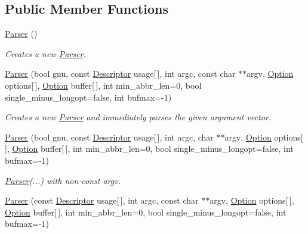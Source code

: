 \subsection*{\-Public \-Member \-Functions}
\begin{DoxyCompactItemize}
\item 
\hypertarget{classoption_1_1_parser_a895e9a1db19f1a026ee6a7412de17d04}{\hyperlink{classoption_1_1_parser_a895e9a1db19f1a026ee6a7412de17d04}{\-Parser} ()}\label{classoption_1_1_parser_a895e9a1db19f1a026ee6a7412de17d04}

\begin{DoxyCompactList}\small\item\em \-Creates a new \hyperlink{classoption_1_1_parser}{\-Parser}. \end{DoxyCompactList}\item 
\hyperlink{classoption_1_1_parser_aa747e9792c9c08ede32b6c323438db71}{\-Parser} (bool gnu, const \hyperlink{structoption_1_1_descriptor}{\-Descriptor} usage\mbox{[}$\,$\mbox{]}, int argc, const char $\ast$$\ast$argv, \hyperlink{classoption_1_1_option}{\-Option} options\mbox{[}$\,$\mbox{]}, \hyperlink{classoption_1_1_option}{\-Option} buffer\mbox{[}$\,$\mbox{]}, int min\-\_\-abbr\-\_\-len=0, bool single\-\_\-minus\-\_\-longopt=false, int bufmax=-\/1)
\begin{DoxyCompactList}\small\item\em \-Creates a new \hyperlink{classoption_1_1_parser}{\-Parser} and immediately parses the given argument vector. \end{DoxyCompactList}\item 
\hypertarget{classoption_1_1_parser_a78b4c7d73fff17204dd908b1b167dec9}{\hyperlink{classoption_1_1_parser_a78b4c7d73fff17204dd908b1b167dec9}{\-Parser} (bool gnu, const \hyperlink{structoption_1_1_descriptor}{\-Descriptor} usage\mbox{[}$\,$\mbox{]}, int argc, char $\ast$$\ast$argv, \hyperlink{classoption_1_1_option}{\-Option} options\mbox{[}$\,$\mbox{]}, \hyperlink{classoption_1_1_option}{\-Option} buffer\mbox{[}$\,$\mbox{]}, int min\-\_\-abbr\-\_\-len=0, bool single\-\_\-minus\-\_\-longopt=false, int bufmax=-\/1)}\label{classoption_1_1_parser_a78b4c7d73fff17204dd908b1b167dec9}

\begin{DoxyCompactList}\small\item\em \hyperlink{classoption_1_1_parser}{\-Parser}(...) with non-\/const argv. \end{DoxyCompactList}\item 
\hypertarget{classoption_1_1_parser_ae4100da4b662937ead22484e6cfc7cec}{\hyperlink{classoption_1_1_parser_ae4100da4b662937ead22484e6cfc7cec}{\-Parser} (const \hyperlink{structoption_1_1_descriptor}{\-Descriptor} usage\mbox{[}$\,$\mbox{]}, int argc, const char $\ast$$\ast$argv, \hyperlink{classoption_1_1_option}{\-Option} options\mbox{[}$\,$\mbox{]}, \hyperlink{classoption_1_1_option}{\-Option} buffer\mbox{[}$\,$\mbox{]}, int min\-\_\-abbr\-\_\-len=0, bool single\-\_\-minus\-\_\-longopt=false, int bufmax=-\/1)}\label{classoption_1_1_parser_ae4100da4b662937ead22484e6cfc7cec}


\end{DoxyCompactItemize}
